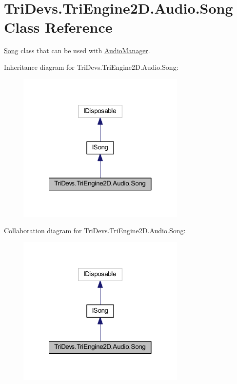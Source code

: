 \hypertarget{class_tri_devs_1_1_tri_engine2_d_1_1_audio_1_1_song}{\section{Tri\-Devs.\-Tri\-Engine2\-D.\-Audio.\-Song Class Reference}
\label{class_tri_devs_1_1_tri_engine2_d_1_1_audio_1_1_song}
}


\hyperlink{class_tri_devs_1_1_tri_engine2_d_1_1_audio_1_1_song}{Song} class that can be used with \hyperlink{class_tri_devs_1_1_tri_engine2_d_1_1_audio_1_1_audio_manager}{Audio\-Manager}.  




Inheritance diagram for Tri\-Devs.\-Tri\-Engine2\-D.\-Audio.\-Song\-:
\nopagebreak
\begin{figure}[H]
\begin{center}
\leavevmode
\includegraphics[width=236pt]{class_tri_devs_1_1_tri_engine2_d_1_1_audio_1_1_song__inherit__graph}
\end{center}
\end{figure}


Collaboration diagram for Tri\-Devs.\-Tri\-Engine2\-D.\-Audio.\-Song\-:
\nopagebreak
\begin{figure}[H]
\begin{center}
\leavevmode
\includegraphics[width=236pt]{class_tri_devs_1_1_tri_engine2_d_1_1_audio_1_1_song__coll__graph}
\end{center}
\end{figure}

